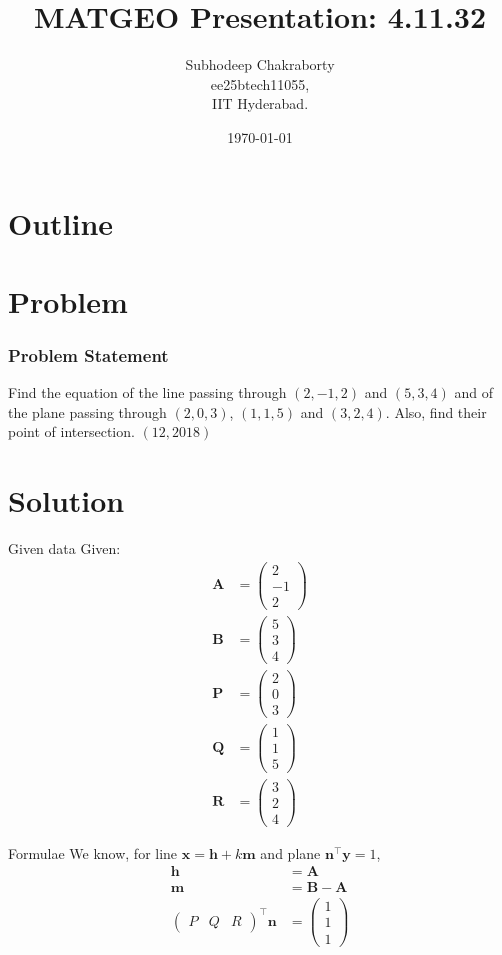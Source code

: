 \documentclass{beamer}
\title{MATGEO Presentation: 4.11.32}
\author{Subhodeep Chakraborty \\ ee25btech11055,\\IIT Hyderabad.}
\date{\today}
\providecommand{\brak}[1]{\ensuremath{\left(#1\right)}}
\theoremstyle{remark}
\newcommand{\myvec}[1]{\ensuremath{\begin{pmatrix}#1\end{pmatrix}}}
\let\vec\mathbf
\numberwithin{equation}{section}
\begin{document}
\begin{frame}
\titlepage
\end{frame}

\section*{Outline}
\begin{frame}
\tableofcontents
\end{frame}

\section{Problem}
\begin{frame}
\frametitle{Problem Statement}

Find the equation of the line passing through \brak{2,-1,2} and \brak{5,3,4} and of the plane passing through \brak{2,0,3}, \brak{1,1,5} and \brak{3,2,4}. Also, find their point of intersection. \hfill \brak{12,2018}

\end{frame}

\section{Solution}
\begin{frame}{Given data}
Given:
\begin{align}
 \vec{A} &= \myvec{2\\-1\\2} \\
 \vec{B} &= \myvec{5\\3\\4} \\
 \vec{P} &= \myvec{2\\0\\3} \\
 \vec{Q} &= \myvec{1\\1\\5} \\
 \vec{R} &= \myvec{3\\2\\4}
\end{align}
\end{frame}

\begin{frame}{Formulae}
We know, for line $\vec{x} = \vec{h} +k\vec{m}$ and plane $\vec{n}^\top\vec{y}=1$,
\begin{align}
 \vec{h} &= \vec{A} \\
 \vec{m} &= \vec{B-A} \\
 \myvec{P & Q & R}^\top\vec{n} &= \myvec{1\\1\\1}
\end{align}
\end{frame}
\end{document}
